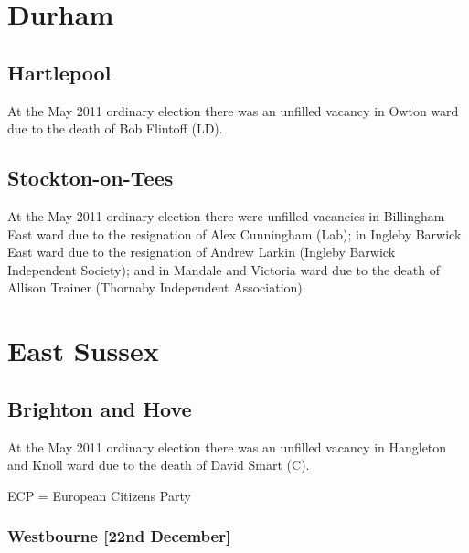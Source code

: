 \begin{resultsiii}
\section{Durham}

\subsection*{Hartlepool}


At the May 2011 ordinary election there was an unfilled vacancy in Owton ward due to the death of Bob Flintoff (LD).

\subsection*{Stockton-on-Tees}


At the May 2011 ordinary election there were unfilled vacancies in Billingham East ward due to the resignation of Alex Cunningham (Lab); in Ingleby Barwick East ward due to the resignation of Andrew Larkin (Ingleby Barwick Independent Society); and in Mandale and Victoria ward due to the death of Allison Trainer (Thornaby Independent Association).

\section{East Sussex}

\subsection*{Brighton and Hove}


At the May 2011 ordinary election there was an unfilled vacancy in Hangleton and Knoll ward due to the death of David Smart (C).

ECP = European Citizens Party

\subsubsection*{Westbourne \hspace*{\fill}\nolinebreak[1]%
\enspace\hspace*{\fill}
[22nd December]}


\end{resultsiii}

